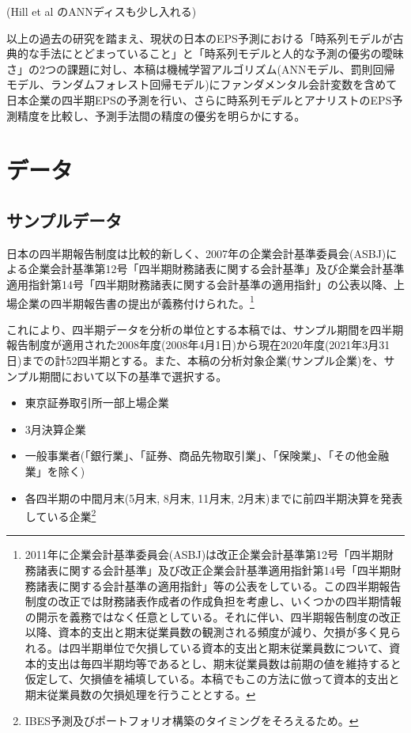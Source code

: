 \documentclass[a4paper, 12pt]{jsreport}
\begin{document}
(Hill et al のANNディスも少し入れる)

以上の過去の研究を踏まえ、現状の日本のEPS予測における「時系列モデルが古典的な手法にとどまっていること」と「時系列モデルと人的な予測の優劣の曖昧さ」の2つの課題に対し、本稿は機械学習アルゴリズム(ANNモデル、罰則回帰モデル、ランダムフォレスト回帰モデル)にファンダメンタル会計変数を含めて日本企業の四半期EPSの予測を行い、さらに時系列モデルとアナリストのEPS予測精度を比較し、予測手法間の精度の優劣を明らかにする。

\chapter{データ}

\section{サンプルデータ}

日本の四半期報告制度は比較的新しく、2007年の企業会計基準委員会(ASBJ)による企業会計基準第12号「四半期財務諸表に関する会計基準」及び企業会計基準適用指針第14号「四半期財務諸表に関する会計基準の適用指針」の公表以降、上場企業の四半期報告書の提出が義務付けられた。\footnote{2011年に企業会計基準委員会(ASBJ)は改正企業会計基準第12号「四半期財務諸表に関する会計基準」及び改正企業会計基準適用指針第14号「四半期財務諸表に関する会計基準の適用指針」等の公表をしている。この四半期報告制度の改正では財務諸表作成者の作成負担を考慮し、いくつかの四半期情報の開示を義務ではなく任意としている。それに伴い、四半期報告制度の改正以降、資本的支出と期末従業員数の観測される頻度が減り、欠損が多く見られる。\cite{zhang2004neural}は四半期単位で欠損している資本的支出と期末従業員数について、資本的支出は毎四半期均等であるとし、期末従業員数は前期の値を維持すると仮定して、欠損値を補填している。本稿でもこの方法に倣って資本的支出と期末従業員数の欠損処理を行うこととする。}

これにより、四半期データを分析の単位とする本稿では、サンプル期間を四半期報告制度が適用された2008年度(2008年4月1日)から現在2020年度(2021年3月31日)までの計52四半期とする。また、本稿の分析対象企業(サンプル企業)を、サンプル期間において以下の基準で選択する。

\begin{itemize}
  \item 東京証券取引所一部上場企業
  \item 3月決算企業
  \item 一般事業者(「銀行業」、「証券、商品先物取引業」、「保険業」、「その他金融業」を除く)
  \item 各四半期の中間月末(5月末, 8月末, 11月末, 2月末)までに前四半期決算を発表している企業\footnote{IBES予測及びポートフォリオ構築のタイミングをそろえるため。}
\end{itemize}
\end{document}

